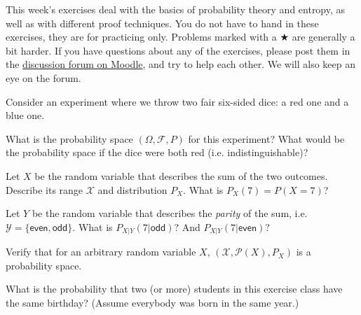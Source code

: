 \documentclass[a4paper,10pt,landscape,twocolumn]{scrartcl}
\newcommand\deadline{Friday November 11th, 20:00h}
\begin{document}
\practiceproblems

{\sffamily\noindent
This week's exercises deal with the basics of probability theory and entropy, as well as with different proof techniques. You do not have to hand in these exercises, they are for practicing only. Problems marked with a $\bigstar$ are generally a bit harder. If you have questions about any of the exercises, please post them in the \href{https://www.moodle.ch/lms/mod/forum/view.php?id=1761}{discussion forum on Moodle}, and try to help each other. We will also keep an eye on the forum.
}

\enlargethispage{1cm}
\begin{exercise}
Consider an experiment where we throw two fair six-sided dice: a red one and a blue one.
	\begin{subex}
	What is the probability space $(\Omega,\mathcal{F},P)$ for this experiment? What would be the probability space if the dice were both red (i.e. indistinguishable)?
	\end{subex}
	\begin{subex}
	Let $X$ be the random variable that describes the sum of the two outcomes. Describe its range $\mathcal{X}$ and distribution $P_X$. What is $P_X(7) = P(X=7)$?
	\end{subex}
	\begin{subex}
	Let $Y$ be the random variable that describes the \emph{parity} of the sum, i.e. $\mathcal{Y} = \{\mathsf{even}, \mathsf{odd}\}$. What is $P_{X|Y}(7|\mathsf{odd})$? And $P_{X|Y}(7|\mathsf{even})$?
	\end{subex}
	\begin{subex}
	Verify that for an arbitrary random variable $X$, $(\mathcal{X},\mathcal{P}(X),P_X)$ is a probability space.
	\end{subex}
\end{exercise}

\begin{exercise}
What is the probability that two (or more) students in this exercise class have the same birthday? (Assume everybody was born in the same year.)
\end{exercise}
\end{document}
